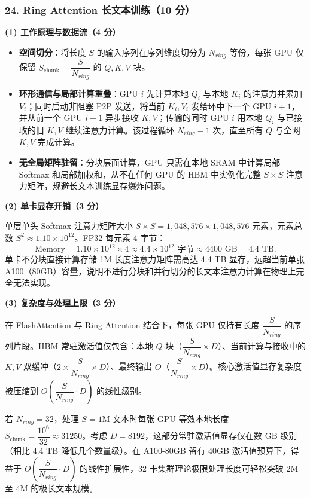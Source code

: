 \documentclass[11pt,a4paper]{article}
\begin{document}
\subsubsection*{24. Ring Attention 长文本训练（10 分）}

\noindent\textbf{(1) 工作原理与数据流（4 分）}

\begin{itemize}[leftmargin=2em,itemsep=0pt,parsep=0pt,topsep=0pt]
  \item \textbf{空间切分}：将长度 $S$ 的输入序列在序列维度切分为 $N_{ring}$ 等份，每张 GPU 仅保留 $S_{\text{chunk}}=\dfrac{S}{N_{ring}}$ 的 $Q,K,V$ 块。
  \item \textbf{环形通信与局部计算重叠}：GPU $i$ 先计算本地 $Q_i$ 与本地 $K_i$ 的注意力并累加 $V_i$；同时启动非阻塞 P2P 发送，将当前 $K_i,V_i$ 发给环中下一个 GPU $i+1$，并从前一个 GPU $i-1$ 异步接收 $K,V$；传输的同时 GPU $i$ 用本地 $Q_i$ 与已接收的旧 $K,V$ 继续注意力计算。该过程循环 $N_{ring}-1$ 次，直至所有 $Q$ 与全网 $K,V$ 完成计算。
  \item \textbf{无全局矩阵驻留}：分块层面计算，GPU 只需在本地 SRAM 中计算局部 Softmax 和局部加权和，从不在任何 GPU 的 HBM 中实例化完整 $S\times S$ 注意力矩阵，规避长文本训练显存爆炸问题。
\end{itemize}

\noindent\textbf{(2) 单卡显存开销（3 分）}

单层单头 Softmax 注意力矩阵大小 $S\times S=1{,}048{,}576\times1{,}048{,}576$ 元素，元素总数 $S^2\approx1.10\times10^{12}$。FP32 每元素 4 字节：
\[
\text{Memory}=1.10\times10^{12}\times4\approx4.4\times10^{12}\text{ 字节}\approx4400\text{ GB}=4.4\text{ TB}.
\]
单卡不分块直接计算存储 1M 长度注意力矩阵需高达 4.4 TB 显存，远超当前单张 A100（80GB）容量，说明不进行分块和并行切分的长文本注意力计算在物理上完全无法实现。

\noindent\textbf{(3) 复杂度与处理上限（3 分）}

在 FlashAttention 与 Ring Attention 结合下，每张 GPU 仅持有长度 $\dfrac{S}{N_{ring}}$ 的序列片段。HBM 常驻激活值仅包含：本地 $Q$ 块（$\dfrac{S}{N_{ring}}\times D$）、当前计算与接收中的 $K,V$ 双缓冲（$2\times\dfrac{S}{N_{ring}}\times D$）、最终输出 $O$（$\dfrac{S}{N_{ring}}\times D$）。核心激活值显存复杂度被压缩到 $O\!\left(\dfrac{S}{N_{ring}}\cdot D\right)$ 的线性级别。

若 $N_{ring}=32$，处理 $S=1\text{M}$ 文本时每张 GPU 等效本地长度 $S_{\text{chunk}}=\dfrac{10^6}{32}\approx31250$。考虑 $D=8192$，这部分常驻激活值显存仅在数 GB 级别（相比 4.4 TB 降低几个数量级）。在 A100-80GB 留有 40GB 激活值预算下，得益于 $O\!\left(\dfrac{S}{N_{ring}}\cdot D\right)$ 的线性扩展性，32 卡集群理论极限处理长度可轻松突破 2M 至 4M 的极长文本规模。
\end{document}
